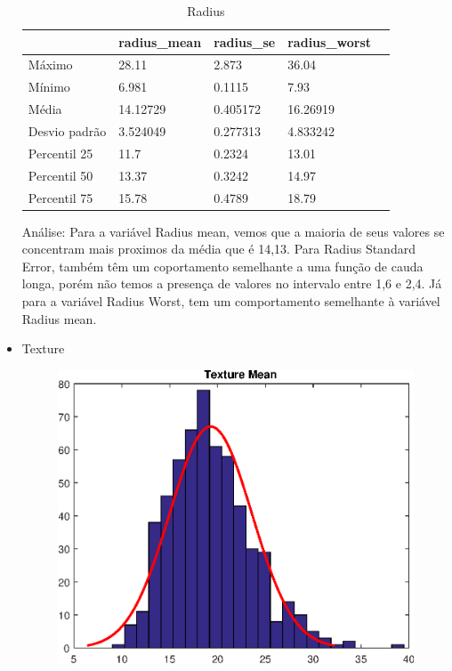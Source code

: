 \documentclass[11pt,a4paper]{article}
\numberwithin{equation}{section}
\begin{document}
\begin{itemize}
\begin{figure}[H]
\begin{minipage}{.4\textwidth}
  \label{fig:test2}
\end{minipage}
\end{figure}

\begin{table}[H]
\centering
\caption{Radius}
\label{my-label}
\begin{tabular}{lllll}
\hline
              & radius\_mean & radius\_se & radius\_worst &  \\
\hline
Máximo        & 28.11        & 2.873      & 36.04         &  \\
Mínimo        & 6.981        & 0.1115     & 7.93          &  \\
Média         & 14.12729     & 0.405172   & 16.26919      &  \\
Desvio padrão & 3.524049     & 0.277313   & 4.833242      &  \\
Percentil 25  & 11.7         & 0.2324     & 13.01         &  \\
Percentil 50  & 13.37        & 0.3242     & 14.97         &  \\
Percentil 75  & 15.78        & 0.4789     & 18.79         &  \\
\hline
\end{tabular}
\end{table}


Análise: Para a variável Radius mean, vemos que a maioria de seus valores se concentram mais proximos da média que é 14,13.
Para Radius Standard Error, também têm um coportamento semelhante a uma função de cauda longa, porém não temos a presença de valores no intervalo entre 1,6 e 2,4.
Já para a variável Radius Worst, tem um comportamento semelhante à variável Radius mean.

\item Texture
\begin{figure}[H]
\centering
  \includegraphics[width=.4\linewidth]{./img/texture_mean}
  \label{fig:test1}
\end{figure}%


\end{itemize}
\end{document}
